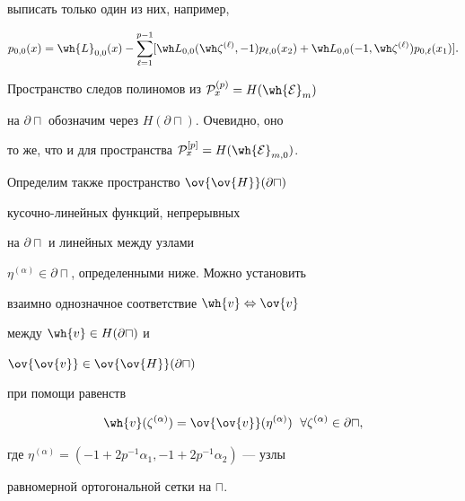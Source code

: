 выписать только один из них, например,


\begin{equation}\label{eq6.6}


p_{0,0}(x) = \wh{L}_{0,0}(x) - \sum^{p-1}_{\ell=1}[\wh L_{0,0}


(\wh \zeta^{(\ell)},-1)p_{\ell,0}(x_2)+


\wh L_{0,0}(-1, \wh \zeta^{(\ell)})p_{0,\ell}(x_1)].


\end{equation}





Пространство следов полиномов из ${\cal P}^{(p)}_x = H(\wh{{\cal E}}_m)$ 


на $\partial\sqcap$ обозначим через $H(\partial\sqcap)$. Очевидно, оно


то же, что и для пространства ${\cal P}^{[p]}_x = H(\wh{{\cal E}}_{m,0})$.


Определим также пространство $\ov{\ov{H}}(\partial\sqcap)$


кусочно-линейных функций, непрерывных 


на $\partial\sqcap$ и линейных между узлами 


$\eta^{(\alpha)} \in \partial\sqcap$, определенными ниже. Можно установить 


взаимно однозначное соответствие $\wh{v} \Leftrightarrow \ov{v}$ 


между $\wh{v} \in H(\partial\sqcap)$ и


$\ov{\ov{v}} \in \ov{\ov{H}}(\partial\sqcap)$


при помощи равенств


\begin{equation}\label{eq6.7}


\wh{v}(\zeta^{(\alpha)}) = \ov{\ov{v}}(\eta^{(\alpha)}) \ \;


\forall\zeta^{(\alpha)} \in \partial\sqcap,


\end{equation}


где $\eta^{(\alpha)}=(-1 + 2p^{-1}\alpha_1, -1 + 2p^{-1}\alpha_2)$ --- узлы 


равномерной ортогональной сетки на $\sqcap$.





